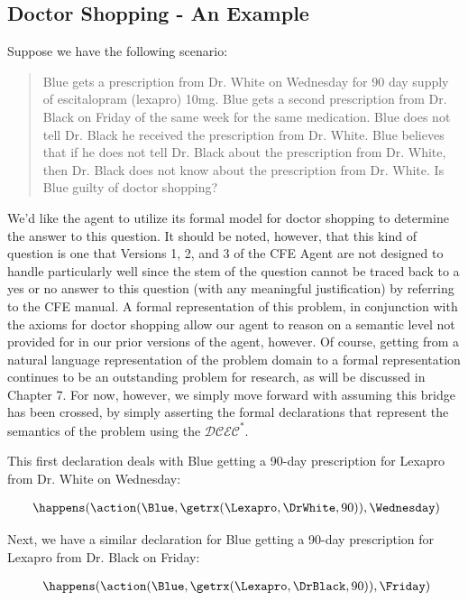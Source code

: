 \subsection{Doctor Shopping - An Example}

Suppose we have the following scenario:
\blockquote{Blue gets a prescription from Dr. White on Wednesday for 90 day supply of escitalopram (lexapro) 10mg.  Blue gets a second prescription from Dr. Black on Friday of the same week for the same medication.  Blue does not tell Dr. Black he received the prescription from Dr. White.  Blue believes that if he does not tell Dr. Black about the prescription from Dr. White, then Dr. Black does not know about the prescription from Dr. White.  Is Blue guilty of doctor shopping?}

We'd like the agent to utilize its formal model for doctor shopping to determine the answer to this question.  It should be noted, however, that this kind of question is one that Versions 1, 2, and 3 of the CFE Agent are not designed to handle particularly well since the stem of the question cannot be traced back to a yes or no answer to this question (with any meaningful justification) by referring to the CFE manual.  A formal representation of this problem, in conjunction with the axioms for doctor shopping allow our agent to reason on a semantic level not provided for in our prior versions of the agent, however.  Of course, getting from a natural language representation of the problem domain to a formal representation continues to be an outstanding problem for research, as will be discussed in Chapter 7.  For now, however, we simply move forward with assuming this bridge has been crossed, by simply asserting the formal declarations that represent the semantics of the problem using the $\mathcal{DCEC}^\ast$.

This first declaration deals with Blue getting a 90-day prescription for Lexapro from Dr. White on Wednesday: 

\begin{footnotesize}
\begin{align*}
[D1] \ \happens(\action(\Blue,\getrx(\Lexapro,\DrWhite,90)),\Wednesday)
\end{align*}
\end{footnotesize}

\noindent Next, we have a similar declaration for Blue getting a 90-day prescription for Lexapro from Dr. Black on Friday:
\begin{footnotesize}
\begin{align*}
[D2] \ \happens(\action(\Blue,\getrx(\Lexapro,\DrBlack,90)),\Friday)
\end{align*}
\end{footnotesize}

